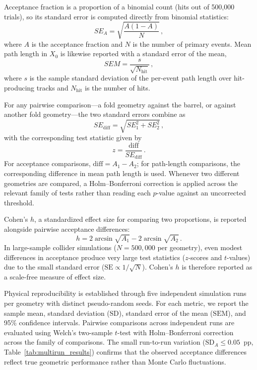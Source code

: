 \documentclass[a4paper,11pt]{article}
\begin{document}
Acceptance fraction is a proportion of a binomial count (hits out of 500{,}000 trials), so its standard error is computed directly from binomial statistics:
\begin{equation}
\label{eq:se_binomial}
SE_A = \sqrt{\frac{A(1-A)}{N}}\,,
\end{equation}
where $A$ is the acceptance fraction and $N$ is the number of primary events. Mean path length in $X_0$ is likewise reported with a standard error of the mean,
\begin{equation}
\label{eq:sem_path}
SEM = \frac{s}{\sqrt{N_{\mathrm{hit}}}}\,,
\end{equation}
where $s$ is the sample standard deviation of the per-event path length over hit-producing tracks and $N_{\mathrm{hit}}$ is the number of hits.

For any pairwise comparison---a fold geometry against the barrel, or against another fold geometry---the two standard errors combine as
\begin{equation}
\label{eq:se_diff}
SE_{\mathrm{diff}} = \sqrt{SE_1^2 + SE_2^2}\,,
\end{equation}
with the corresponding test statistic given by
\begin{equation}
\label{eq:z_score}
z = \frac{\mathrm{diff}}{SE_{\mathrm{diff}}}\,.
\end{equation}
For acceptance comparisons, $\mathrm{diff}=A_1-A_2$; for path-length comparisons, the corresponding difference in mean path length is used. Whenever two different geometries are compared, a Holm--Bonferroni correction is applied across the relevant family of tests rather than reading each $p$-value against an uncorrected threshold.

Cohen's $h$, a standardized effect size for comparing two proportions, is reported alongside pairwise acceptance differences:
\begin{equation}
\label{eq:cohen_h}
h = 2\arcsin\sqrt{A_1} - 2\arcsin\sqrt{A_2}\,.
\end{equation}
In large-sample collider simulations ($N = 500{,}000$ per geometry), even modest differences in acceptance produce very large test statistics ($z$-scores and $t$-values) due to the small standard error ($\mathrm{SE} \propto 1/\sqrt{N}$). Cohen's $h$ is therefore reported as a scale-free measure of effect size.

Physical reproducibility is established through five independent simulation runs per geometry with distinct pseudo-random seeds. For each metric, we report the sample mean, standard deviation ($\mathrm{SD}$), standard error of the mean ($\mathrm{SEM}$), and 95\% confidence intervals. Pairwise comparisons across independent runs are evaluated using Welch's two-sample $t$-test with Holm--Bonferroni correction across the family of comparisons. The small run-to-run variation ($\mathrm{SD}_A \le 0.05$~pp, Table~\ref{tab:multirun_results}) confirms that the observed acceptance differences reflect true geometric performance rather than Monte Carlo fluctuations.
\end{document}
